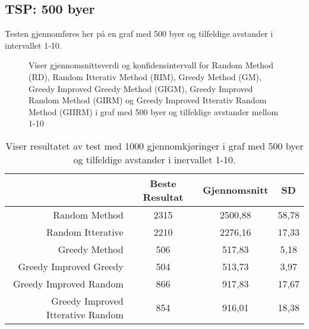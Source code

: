 \documentclass[12pt]{article}
\begin{document}
\subsection{TSP: 500 byer}
Testen gjennomføres her på en graf med 500 byer og tilfeldige avstander i intervallet 1-10.	
\begin{figure}[h]
\centering
\caption{Viser gjennomsnittsverdi og konfidensintervall for Random Method (RD), Random Itterativ Method (RIM), Greedy Method (GM), Greedy Improved Greedy Method (GIGM), Greedy Improved Random Method (GIRM) og Greedy Improved Itterativ Random Method (GIIRM) i graf med 500 byer og tilfeldige avstander mellom 1-10}
\end{figure}

\begin{table}[h]
\begin{tabular}{ |r|c|c|c|} 
\hline
  & Beste Resultat & Gjennomsnitt & SD\\ 
 \hline
 Random Method & 2315 & 2500,88& 58,78\\ 
 \hline
 Random Itterative & 2210 & 2276,16 & 17,33 \\ 
  \hline
 Greedy Method & 506 & 517,83 & 5,18\\ 
 \hline
 Greedy Improved Greedy& 504 & 513,73 & 3,97 \\ 
 \hline
  Greedy Improved Random& 866 & 917,83 & 17,67 \\ 
   \hline
     Greedy Improved Itterative Random& 854 & 916,01 & 18,38\\ 
 \hline

 \end{tabular}
\caption{Viser resultatet av test med 1000 gjennomkjøringer i graf med 500 byer og tilfeldige avstander i inervallet 1-10.}
\end{table}
\newpage
\end{document}
